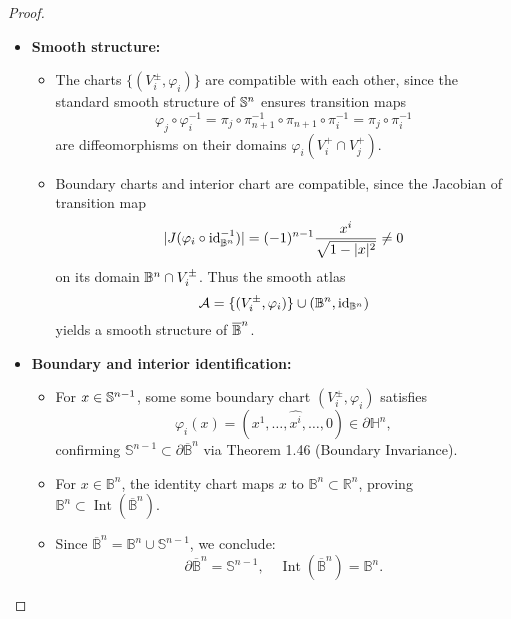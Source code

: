 \begin{problem}
\begin{proof}
\begin{itemize}
      \item \textbf{Smooth structure:} 
        \begin{itemize}
          \item The charts $\{(V_i^{\pm}, \varphi_i)\}$ are compatible with each other, since the standard smooth structure of $\mathbb{S}^n$ ensures transition maps
            \begin{equation*}
              \varphi_j \circ \varphi_i^{-1} = \pi_j \circ \pi_{n+1}^{-1} \circ \pi_{n+1} \circ \pi_i^{-1} = \pi_j \circ \pi_i^{-1}
            \end{equation*}
            are diffeomorphisms on their domains $\varphi_i(V_i^+ \cap V_j^+)$.
          \item Boundary charts and interior chart are compatible, since the Jacobian of transition map
            \begin{equation*}
              |J(\varphi_i \circ \text{id}^{-1}_{\mathbb{B}^n})| = (-1)^{n-1}\dfrac{x^i}{\sqrt{1-|x|^2}} \neq 0
            \end{equation*}
            on its domain $\mathbb{B}^n \cap V_i^{\pm}$. Thus the smooth atlas
            \begin{equation*}
              \mathcal{A} = \{(V_i^{\pm}, \varphi_i)\} \cup (\mathbb{B}^n, \text{id}_{\mathbb{B}^n})
            \end{equation*}
            yields a smooth structure of $\overline{\mathbb{B}}^n$.
          \end{itemize}
      \item \textbf{Boundary and interior identification:} 
        \begin{itemize}
          \item For $x \in \mathbb{S}^{n-1}$, some some boundary chart $(V_i^{\pm}, \varphi_i)$ satisfies 
            \begin{equation*}
              \varphi_i(x) = (x^1, \dots, \widehat{x^i}, \dots, 0) \in \partial \mathbb{H}^n,
            \end{equation*}
            confirming $\mathbb{S}^{n-1} \subset \partial \overline{\mathbb{B}}^n$ via Theorem 1.46 (Boundary Invariance).
          \item For $x \in \mathbb{B}^n$, the identity chart maps $x$ to $\mathbb{B}^n \subset \mathbb{R}^n$, proving $\mathbb{B}^n \subset \operatorname{Int}(\overline{\mathbb{B}}^n)$.
          \item Since $\overline{\mathbb{B}}^n = \mathbb{B}^n \cup \mathbb{S}^{n-1}$, we conclude:
            \begin{equation*}
              \partial \overline{\mathbb{B}}^n = \mathbb{S}^{n-1}, \quad \operatorname{Int}(\overline{\mathbb{B}}^n) = \mathbb{B}^n.
            \end{equation*}
      \end{itemize} 
    \end{itemize}
  \end{proof}
\end{problem}

